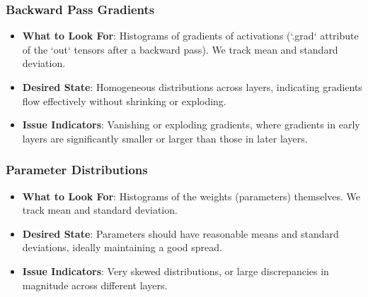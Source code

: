\subsubsection{Backward Pass Gradients}
\begin{itemize}
    \item \textbf{What to Look For}: Histograms of gradients of activations (`.grad` attribute of the `out` tensors after a backward pass). We track mean and standard deviation.
    \item \textbf{Desired State}: Homogeneous distributions across layers, indicating gradients flow effectively without shrinking or exploding.
    \item \textbf{Issue Indicators}: Vanishing or exploding gradients, where gradients in early layers are significantly smaller or larger than those in later layers.
\end{itemize}

\subsubsection{Parameter Distributions}
\begin{itemize}
    \item \textbf{What to Look For}: Histograms of the weights (parameters) themselves. We track mean and standard deviation.
    \item \textbf{Desired State}: Parameters should have reasonable means and standard deviations, ideally maintaining a good spread.
    \item \textbf{Issue Indicators}: Very skewed distributions, or large discrepancies in magnitude across different layers.
\end{itemize}

